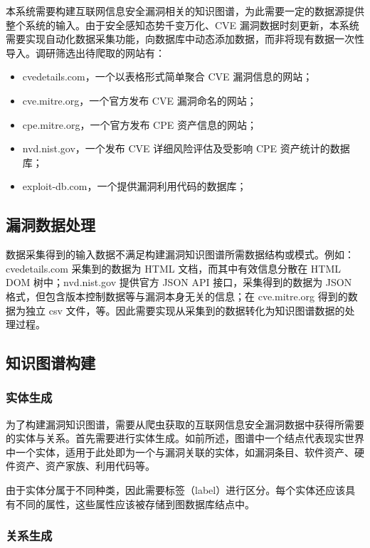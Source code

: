 \documentclass[a4paper,AutoFakeBold,oneside,12pt]{book}
\begin{document}
本系统需要构建互联网信息安全漏洞相关的知识图谱，为此需要一定的数据源提供整个系统的输入。由于安全感知态势千变万化、CVE 漏洞数据时刻更新，本系统需要实现自动化数据采集功能，向数据库中动态添加数据，而非将现有数据一次性导入。调研筛选出待爬取的网站有：
\begin{itemize}
	\item cvedetails.com，一个以表格形式简单聚合 CVE 漏洞信息的网站；
	\item cve.mitre.org，一个官方发布 CVE 漏洞命名的网站；
	\item cpe.mitre.org，一个官方发布 CPE 资产信息的网站；
	\item nvd.nist.gov，一个发布 CVE 详细风险评估及受影响 CPE 资产统计的数据库；
	\item exploit-db.com，一个提供漏洞利用代码的数据库；
\end{itemize}

\subsection{漏洞数据处理}

数据采集得到的输入数据不满足构建漏洞知识图谱所需数据结构或模式。例如：cvedetails.com 采集到的数据为 HTML 文档，而其中有效信息分散在 HTML DOM 树中；nvd.nist.gov 提供官方 JSON API 接口，采集得到的数据为 JSON 格式，但包含版本控制数据等与漏洞本身无关的信息；在 cve.mitre.org 得到的数据为独立 csv 文件，等。因此需要实现从采集到的数据转化为知识图谱数据的处理过程。

\subsection{知识图谱构建}

\subsubsection{实体生成}

为了构建漏洞知识图谱，需要从爬虫获取的互联网信息安全漏洞数据中获得所需要的实体与关系。首先需要进行实体生成。如前所述，图谱中一个结点代表现实世界中一个实体，适用于此处即为一个与漏洞关联的实体，如漏洞条目、软件资产、硬件资产、资产家族、利用代码等。

由于实体分属于不同种类，因此需要标签（label）进行区分。每个实体还应该具有不同的属性，这些属性应该被存储到图数据库结点中。

\subsubsection{关系生成}
\end{document}
